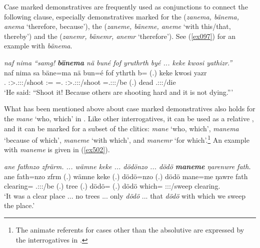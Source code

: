 Case marked demonstratives are frequently used as conjunctions to connect the following clause, especially demonstratives marked for the  (\emph{zanema, bänema, anema} `therefore, because'), the  (\emph{zaneme, bäneme, aneme} `with this/that, thereby') and the  (\emph{zanemr, bänemr, anemr} `therefore'). See (\ref{ex097}) for an example with \emph{bänema}.

\begin{exe}
	\ex \emph{naf nima ``samg! \textbf{bänema} nä buné fof yruthrth byé ... keke kwosi yathizr.''}\\
	\gll naf nima sa bäne=ma {nä bun=é} fof ythrth b= (.) keke kwosi yazr\\
	\Tsg.{\Erg} {\Quot} \Ssg:\Sbj>\Tsg.\Masc:\Obj:\Imp:\Pfv/shoot \Dem:\Med={\Char} {\Indf=\Erg.\Nsg} {\Emph} \Stpl:\Sbj>\Tsg.\Masc:\Obj:\Nonpast:\Ipfv/shoot \Med=\Tsg.\Masc:\Sbj:\Nonpast:\Ipfv/be (.) {\Neg} dead \Tsg.\Masc:\Sbj:\Nonpast:\Ipfv/die\\
	\trans `He said: ``Shoot it! Because others are shooting hard and it is not dying.'''\\ 
	\label{ex097}
\end{exe}

What has been mentioned above about case marked demonstratives also holds for the  \emph{mane} `who, which' in . Like other interrogatives, it can be used as a relative , and it can be marked for a subset of the  clitics:  \emph{mane} `who, which',  \emph{manema} `because of which',  \emph{maneme} `with which', and  \emph{manemr} `for which'.\footnote{The animate referents for cases other than the absolutive are expressed by the interrogatives in .} An example with \emph{maneme} is given in (\ref{ex502}).

\begin{exe}
	\ex \emph{ane fathnzo zfrärm. ... wämne keke ... dödönzo ... dödö \textbf{maneme} ŋarenwre fath.}
	\gll ane fath=nzo zfrm (.) wämne keke (.) dödö=nzo (.) dödö mane=me ŋawre fath\\
	{\Dem} clearing={\Only} \Tsg.\F:\Sbj:\Pst:\Dur/be (.) tree {\Neg} (.) dödö={\Only} (.) dödö which={\Ins} \Fpl:\Sbj:\Nonpast:\Ipfv/sweep clearing.\\
	\trans `It was a clear place ... no trees ... only \emph{dödö} ... that \emph{dödö} with which we sweep the place.' 
	\label{ex502}
\end{exe}

